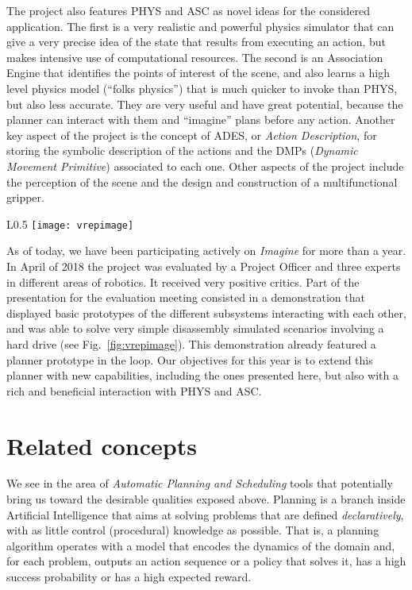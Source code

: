 \documentclass[../root.tex]{subfiles}
\begin{document}
The project also features PHYS and ASC as novel ideas for the considered application.
The first is a very realistic and
powerful physics simulator that can give a very precise idea of the state that results
from executing an action, but makes intensive use of
computational resources. The second is an Association Engine that identifies the
points of interest
of the scene, and also learns a high level physics model (``folks physics'')
that is much quicker to invoke than PHYS, but also less accurate.
They are very useful and have great potential, because the planner can interact
with them and ``imagine'' plans before any action.
Another key aspect of the project is the concept
of ADES, or \emph{Action Description}, for storing the symbolic description
of the actions and the DMPs (\emph{Dynamic Movement Primitive}) associated to
each one. Other aspects of the project include the perception of the scene
and the design and construction of a multifunctional gripper.

\begin{wrapfigure}{L}{0.5\columnwidth}
	\centering
	\texttt{[image: vrepimage]}
	\caption{Execution of a levering action in the V-REP simulator.}
	\label{fig:vrepimage}
\end{wrapfigure}

As of today, we have been participating actively on \emph{Imagine} for more
than a year.
In April of 2018 the project was evaluated by a Project Officer and three experts in
different areas of robotics. It received very positive critics. Part of the
presentation for the evaluation meeting consisted in a demonstration that
displayed basic prototypes of the different subsystems interacting with each
other, and was
able to solve very simple disassembly simulated scenarios
involving a
hard drive (see Fig.~\ref{fig:vrepimage}).
This demonstration already featured a planner prototype in the loop.
Our objectives for this year is to extend this planner with new
capabilities, including the ones presented here, but also with
a rich and beneficial interaction with PHYS and ASC.

\section{Related concepts}

We see in the area of \emph{Automatic Planning and Scheduling}
tools that potentially bring us toward the
desirable qualities exposed above.
Planning is a branch inside Artificial
Intelligence that aims at solving problems that are defined
\emph{declaratively}, with as little control (procedural) knowledge
as possible.
That is, a
planning algorithm
operates with a model that encodes the dynamics of the domain and, for
each problem, outputs
an action sequence
or a policy that solves it, has a high success probability or has a high
expected reward.
\end{document}
